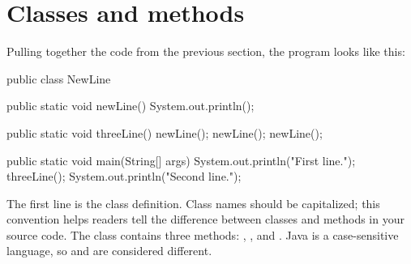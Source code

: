 

\section{Classes and methods}


Pulling together the code from the previous section, the program looks like this:

\begin{code}
public class NewLine {

    public static void newLine() {
        System.out.println();
    }

    public static void threeLine() {
        newLine();
        newLine();
        newLine();
    }

    public static void main(String[] args) {
        System.out.println("First line.");
        threeLine();
        System.out.println("Second line.");
    }
}
\end{code}

The first line is the class definition.
Class names should be capitalized; this convention helps readers tell the difference between classes and methods in your source code.
The  class contains three methods: , , and .
Java is a case-sensitive language, so  and  are considered different.






